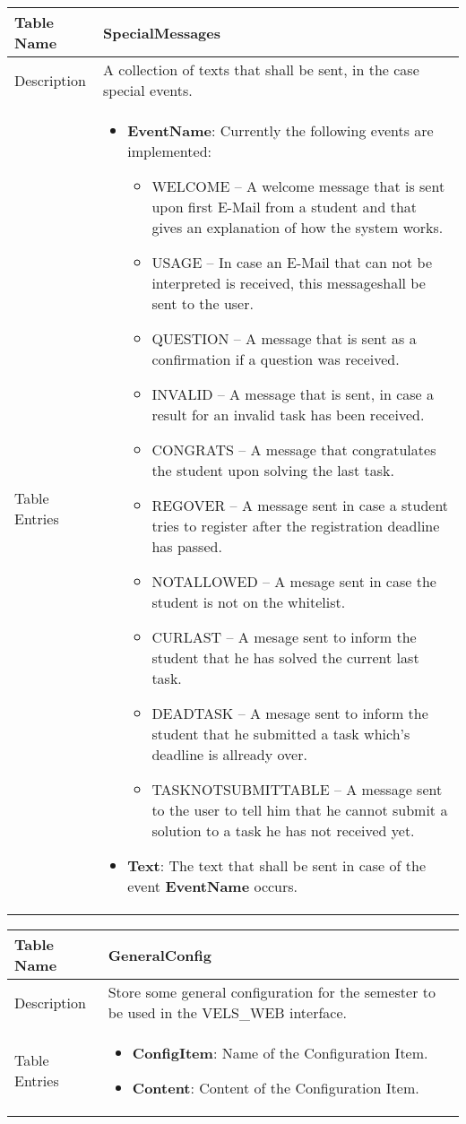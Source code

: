 \begin{tabular}{|p{2.5cm}|p{11cm}|}
\hline
Table Name & SpecialMessages \\
\hline
Description & A collection of texts that shall be sent, in the case special events. \\
\hline
Table Entries & \begin{itemize}
    \item {\bf EventName}: Currently the following events are implemented:
        \begin{itemize}
        \item WELCOME -- A welcome message that is sent upon first E-Mail from a student
			and that gives an explanation of how the system works.
        \item USAGE -- In case an E-Mail that can not be interpreted is received, this
		messageshall be sent to the user.
        \item QUESTION -- A message that is sent as a confirmation if a question was
			received.
        \item INVALID -- A message that is sent, in case a result for an invalid task has
                been received.
        \item CONGRATS -- A message that congratulates the student upon solving the
			last task.
        \item REGOVER -- A message sent in case a student tries to register after the
			registration deadline has passed.
        \item NOTALLOWED -- A mesage sent in case the student is not on the whitelist.
        \item CURLAST -- A mesage sent to inform the student that he has solved the
			current last task.
        \item DEADTASK -- A mesage sent to inform the student that he submitted a task
			which's deadline is allready over.
		\item TASKNOTSUBMITTABLE -- A message sent to the user to tell him that
			he cannot submit a solution to a task he has not received yet.
        \end{itemize}
        \item {\bf Text}: The text that shall be sent in case of the event {\bf EventName}
			occurs.
    \end{itemize} \\
\hline
\end{tabular}

\begin{tabular}{|p{3cm}|p{10cm}|}
\hline
Table Name & GeneralConfig \\
\hline
Description & Store some general configuration for the semester to be used in the
VELS\_WEB interface. \\
\hline
Table Entries & \begin{itemize}
    \item {\bf ConfigItem}: Name of the Configuration Item.
    \item {\bf Content}: Content of the Configuration Item.
    \end{itemize} \\
\hline
\end{tabular}

